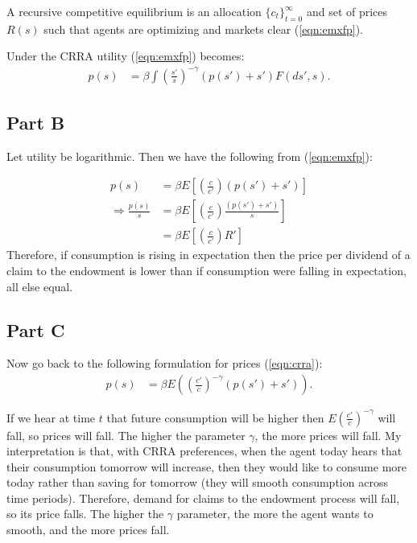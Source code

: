 \documentclass[11pt]{article} %
\begin{document}
A recursive competitive equilibrium is an allocation $\{c_t\}_{t=0}^{\infty}$ and set of prices $R(s)$ such that agents are optimizing and markets clear (\ref{eqn:emxfp}).

Under the CRRA utility (\ref{eqn:emxfp}) becomes:
\begin{align}
p(s) &= \beta\int \left(\frac{s'}{s} \right)^{-\gamma} (p(s') + s' )F(ds',s). \label{eqn:crra}
\end{align}

\subsection{Part B}
Let utility be logarithmic. Then we have the following from (\ref{eqn:emxfp}):

\begin{align*}
p(s) &= \beta E \left[ \left(\frac{c}{c'} \right)(p(s') + s' )\right]\\
\Rightarrow \frac{p(s)}{s} &=  \beta E \left[ \left(\frac{c}{c'} \right)\frac{(p(s') + s' )}{s}\right]\\
&=  \beta E \left[ \left(\frac{c}{c'} \right)R'\right]
\end{align*}
Therefore, if consumption is rising in expectation then the price per dividend of a claim to the endowment is lower than if consumption were falling in expectation, all else equal.
\subsection{Part C}
Now go back to the following formulation for prices (\ref{eqn:crra}):
\begin{align*}
p(s) &= \beta E\left(\left(\frac{c'}{c} \right)^{-\gamma} (p(s') + s' )\right). 
\end{align*}

If we hear at time $t$ that future consumption will be higher then $E\left(\frac{c'}{c} \right)^{-\gamma}$ will fall, so prices will fall. The higher the parameter $\gamma$, the more prices will fall. My interpretation is that, with CRRA preferences, when the agent today hears that their consumption tomorrow will increase, then they would like to consume more today rather than saving for tomorrow (they will smooth consumption across time periods). Therefore, demand for claims to the endowment process will fall, so its price falls. The higher the $\gamma$ parameter, the more the agent wants to smooth, and the more prices fall.
\end{document}
